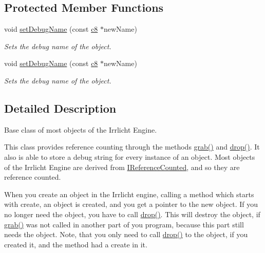 \subsection*{Protected Member Functions}
\begin{DoxyCompactItemize}
\item 
void \hyperlink{classirr_1_1IReferenceCounted_a704c5042d399fe8cd3bdd65a0559002a}{set\+Debug\+Name} (const \hyperlink{namespaceirr_a9395eaea339bcb546b319e9c96bf7410}{c8} $\ast$new\+Name)
\begin{DoxyCompactList}\small\item\em Sets the debug name of the object. \end{DoxyCompactList}\item 
void \hyperlink{classirr_1_1IReferenceCounted_a704c5042d399fe8cd3bdd65a0559002a}{set\+Debug\+Name} (const \hyperlink{namespaceirr_a9395eaea339bcb546b319e9c96bf7410}{c8} $\ast$new\+Name)
\begin{DoxyCompactList}\small\item\em Sets the debug name of the object. \end{DoxyCompactList}\end{DoxyCompactItemize}


\subsection{Detailed Description}
Base class of most objects of the Irrlicht Engine. 

This class provides reference counting through the methods \hyperlink{classirr_1_1IReferenceCounted_a396f9cdbe311ada278626477b3c6f0f5}{grab()} and \hyperlink{classirr_1_1IReferenceCounted_a03856a09355b89d178090c4a5f738543}{drop()}. It also is able to store a debug string for every instance of an object. Most objects of the Irrlicht Engine are derived from \hyperlink{classirr_1_1IReferenceCounted}{I\+Reference\+Counted}, and so they are reference counted.

When you create an object in the Irrlicht engine, calling a method which starts with \textquotesingle{}create\textquotesingle{}, an object is created, and you get a pointer to the new object. If you no longer need the object, you have to call \hyperlink{classirr_1_1IReferenceCounted_a03856a09355b89d178090c4a5f738543}{drop()}. This will destroy the object, if \hyperlink{classirr_1_1IReferenceCounted_a396f9cdbe311ada278626477b3c6f0f5}{grab()} was not called in another part of you program, because this part still needs the object. Note, that you only need to call \hyperlink{classirr_1_1IReferenceCounted_a03856a09355b89d178090c4a5f738543}{drop()} to the object, if you created it, and the method had a \textquotesingle{}create\textquotesingle{} in it.

